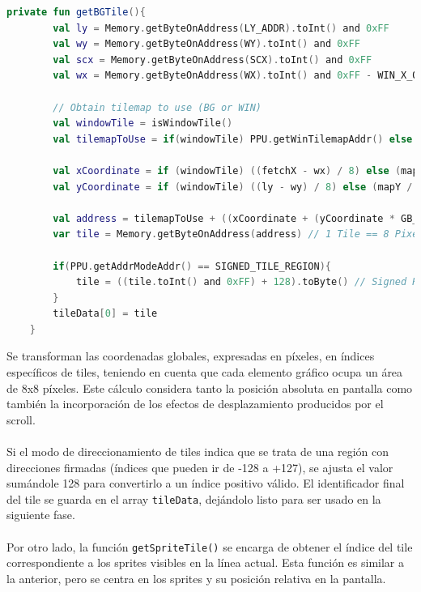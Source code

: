 \begin{lstlisting}[language=Kotlin, caption={FIFO Fetcher - Obtención de Tile de Background.}, label={code:ppufifogettilebg}]
    private fun getBGTile(){
        val ly = Memory.getByteOnAddress(LY_ADDR).toInt() and 0xFF
        val wy = Memory.getByteOnAddress(WY).toInt() and 0xFF
        val scx = Memory.getByteOnAddress(SCX).toInt() and 0xFF
        val wx = Memory.getByteOnAddress(WX).toInt() and 0xFF - WIN_X_OFFSET

        // Obtain tilemap to use (BG or WIN)
        val windowTile = isWindowTile()
        val tilemapToUse = if(windowTile) PPU.getWinTilemapAddr() else PPU.getBGTilemapAddr()

        val xCoordinate = if (windowTile) ((fetchX - wx) / 8) else (mapX / 8) and 0x1F
        val yCoordinate = if (windowTile) ((ly - wy) / 8) else (mapY / 8)

        val address = tilemapToUse + ((xCoordinate + (yCoordinate * GB_X_TOTAL_TILES)) and 0x3ff)
        var tile = Memory.getByteOnAddress(address) // 1 Tile == 8 Pixels

        if(PPU.getAddrModeAddr() == SIGNED_TILE_REGION){
            tile = ((tile.toInt() and 0xFF) + 128).toByte() // Signed Region [-128, 128] --> Transform to [0, 255]
        }
        tileData[0] = tile
    }
\end{lstlisting}

Se transforman las coordenadas globales, expresadas en píxeles, en índices específicos de tiles, teniendo en cuenta que cada elemento gráfico ocupa un área de 8x8 píxeles. Este cálculo considera tanto la posición absoluta en pantalla como también la incorporación de los efectos de desplazamiento producidos por el scroll.
\\\\
Si el modo de direccionamiento de tiles indica que se trata de una región con direcciones firmadas (índices que pueden ir de -128 a +127), se ajusta el valor sumándole 128 para convertirlo a un índice positivo válido. El identificador final del tile se guarda en el array \texttt{tileData}, dejándolo listo para ser usado en la siguiente fase.
\\\\
Por otro lado, la función \texttt{getSpriteTile()} se encarga de obtener el índice del tile correspondiente a los sprites visibles en la línea actual. Esta función es similar a la anterior, pero se centra en los sprites y su posición relativa en la pantalla.

